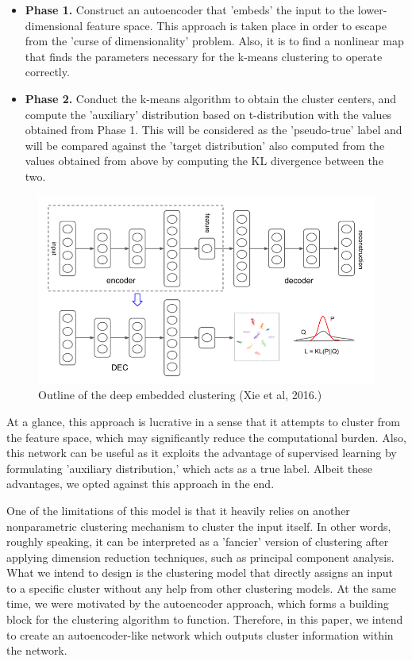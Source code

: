 \documentclass[11pt]{article}
\begin{document}
\begin{itemize}
    \item \textbf{Phase 1.} Construct an autoencoder that 'embeds' the input to the lower-dimensional feature space. This approach is taken place in order to escape from the 'curse of dimensionality' problem. Also, it is to find a nonlinear map that finds the parameters necessary for the k-means clustering to operate correctly.
    \item \textbf{Phase 2.} Conduct the k-means algorithm to obtain the cluster centers, and compute the 'auxiliary' distribution based on t-distribution with the values obtained from Phase 1. This will be considered as the 'pseudo-true' label and will be compared against the 'target distribution' also computed from the values obtained from above by computing the KL divergence between the two.
\end{itemize}

\begin{figure}
    \centering
    \includegraphics[width=14cm]{images/dec-model.png}   
    \caption{Outline of the deep embedded clustering (Xie et al, 2016.)}
    \label{DEC}
    \vspace*{-5mm}
\end{figure}

At a glance, this approach is lucrative in a sense that it attempts to cluster from the feature space, which may significantly reduce the computational burden. Also, this network can be useful as it exploits the advantage of supervised learning by formulating 'auxiliary distribution,' which acts as a true label. Albeit these advantages, we opted against this approach in the end.

One of the limitations of this model is that it heavily relies on another nonparametric clustering mechanism to cluster the input itself. In other words, roughly speaking, it can be interpreted as a 'fancier' version of clustering after applying dimension reduction techniques, such as principal component analysis. What we intend to design is the clustering model that directly assigns an input to a specific cluster without any help from other clustering models. At the same time, we were motivated by the autoencoder approach, which forms a building block for the clustering algorithm to function. Therefore, in this paper, we intend to create an autoencoder-like network which outputs cluster information within the network.
\end{document}

